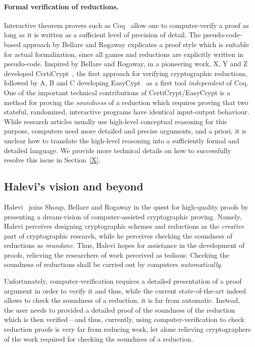 {\paragraph{Formal verification of reductions.} 
Interactive theorem provers such as Coq~\cite{X} allow one to computer-verify a
proof as long as it is written as a sufficient level of precision of detail.
The pseudo-code-based approach by Bellare and Rogaway explicates a proof style which is suitable for actual formalization, since all games and reductions are explicitly written in pseudo-code. Inspired by Bellare and Rogaway, in a pioneering work, X, Y and Z developed CertiCrypt~\cite{X}, the first approach for verifying cryptographic reductions, followed by A, B and C developing EasyCypt~\cite{X} as a first tool \emph{independent} of Coq. One of the important technical contributions of CertiCrypt/EasyCrypt is a method for proving the \emph{soundness} of a reduction which requires proving that two stateful, randomized, interactive programs have identical input-output behaviour. While research articles usually use high-level conceptual reasoning for this purpose, computers need more detailed and precise arguments, and a priori, it is unclear how to translate the high-level reasoning into a sufficiently formal and detailed language. We provide more technical details on how to successfully resolve this issue in Section~\ref{X}.

\subsection{Halevi's vision and beyond}
Halevi~\cite{X} joins Shoup, Bellare and Rogaway in the quest for
high-quality proofs by presenting a dream-vision of computer-assisted 
cryptographic proving. Namely, Halevi perceives designing cryptographic 
schemes and reductions as the \emph{creative} part of cryptographic research, 
while he perceives checking the soundness of reductions as \emph{mundane}. 
Thus, Halevi hopes for assistance in the development of proofs, relieving 
the researchers of work perceived as tedious: Checking the soundness 
of reductions shall be carried out by computers \emph{automatically}.

Unfortunately, computer-verification requires a detailed presentation of a 
proof argument in order to verify it and thus, while the current state-of-the-art
indeed allows to check the soundness of a reduction, it is far from automatic.
Instead, the user needs to provided a detailed proof of the soundness of the
reduction which is then verified---and thus, currently, using computer-verification
to check reduction proofs is very far from reducing work, let alone relieving
cryptographers of the work required for checking the soundness of a reduction.

}

